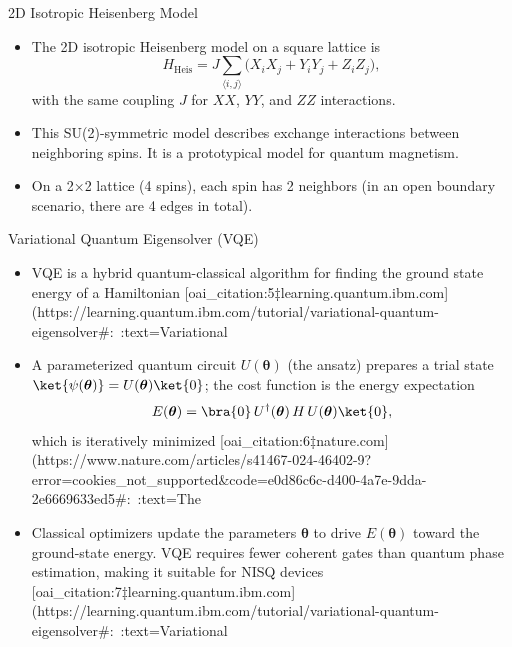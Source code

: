 \documentclass{beamer}
\begin{document}
\begin{frame}{2D Isotropic Heisenberg Model}
\begin{itemize}
\item The 2D isotropic Heisenberg model on a square lattice is
\[
H_{\text{Heis}} = J \sum_{\langle i,j\rangle} \bigl(X_i X_j + Y_i Y_j + Z_i Z_j\bigr),
\]
with the same coupling $J$ for $XX$, $YY$, and $ZZ$ interactions.
\item This SU(2)-symmetric model describes exchange interactions between neighboring spins. It is a prototypical model for quantum magnetism.
\item On a 2×2 lattice (4 spins), each spin has 2 neighbors (in an open boundary scenario, there are 4 edges in total).
\end{itemize}
\end{frame}

\begin{frame}{Variational Quantum Eigensolver (VQE)}
\begin{itemize}
\item VQE is a hybrid quantum-classical algorithm for finding the ground state energy of a Hamiltonian [oai_citation:5‡learning.quantum.ibm.com](https://learning.quantum.ibm.com/tutorial/variational-quantum-eigensolver#:~:text=Variational%
\item A parameterized quantum circuit $U(\boldsymbol{\theta})$ (the ansatz) prepares a trial state $\ket{\psi(\boldsymbol{\theta})} = U(\boldsymbol{\theta})\ket{0}$; the cost function is the energy expectation
\[
E(\boldsymbol{\theta}) = \bra{0}\,U^\dagger(\boldsymbol{\theta})\,H\,U(\boldsymbol{\theta})\ket{0},
\]
which is iteratively minimized [oai_citation:6‡nature.com](https://www.nature.com/articles/s41467-024-46402-9?error=cookies_not_supported&code=e0d86c6c-d400-4a7e-9dda-2e6669633ed5#:~:text=The%
\item Classical optimizers update the parameters $\boldsymbol{\theta}$ to drive $E(\boldsymbol{\theta})$ toward the ground-state energy. VQE requires fewer coherent gates than quantum phase estimation, making it suitable for NISQ devices [oai_citation:7‡learning.quantum.ibm.com](https://learning.quantum.ibm.com/tutorial/variational-quantum-eigensolver#:~:text=Variational%
\end{itemize}
\end{frame}
\end{document}
